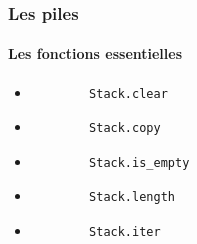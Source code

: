 \begin{frame}[fragile]
	\frametitle{Les piles}
	\framesubtitle{Les fonctions essentielles}
	\begin{itemize}
	
	\item
		\begin{lstlisting}
		Stack.clear
		\end{lstlisting}

	\item
		\begin{lstlisting}
		Stack.copy
		\end{lstlisting}	

	\item
		\begin{lstlisting}
		Stack.is_empty
		\end{lstlisting}	

	\item
		\begin{lstlisting}
		Stack.length
		\end{lstlisting}	

	\item
		\begin{lstlisting}
		Stack.iter
		\end{lstlisting}

	\end{itemize}

\end{frame}

